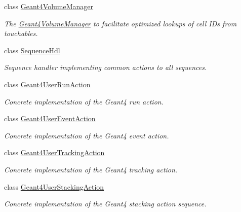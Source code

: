 \begin{DoxyCompactItemize}
class \hyperlink{class_d_d4hep_1_1_simulation_1_1_geant4_volume_manager}{Geant4VolumeManager}
\begin{DoxyCompactList}\small\item\em The \hyperlink{class_d_d4hep_1_1_simulation_1_1_geant4_volume_manager}{Geant4VolumeManager} to facilitate optimized lookups of cell IDs from touchables. \item\end{DoxyCompactList}\item 
class \hyperlink{class_d_d4hep_1_1_simulation_1_1_sequence_hdl}{SequenceHdl}
\begin{DoxyCompactList}\small\item\em Sequence handler implementing common actions to all sequences. \item\end{DoxyCompactList}\item 
class \hyperlink{class_d_d4hep_1_1_simulation_1_1_geant4_user_run_action}{Geant4UserRunAction}
\begin{DoxyCompactList}\small\item\em Concrete implementation of the Geant4 run action. \item\end{DoxyCompactList}\item 
class \hyperlink{class_d_d4hep_1_1_simulation_1_1_geant4_user_event_action}{Geant4UserEventAction}
\begin{DoxyCompactList}\small\item\em Concrete implementation of the Geant4 event action. \item\end{DoxyCompactList}\item 
class \hyperlink{class_d_d4hep_1_1_simulation_1_1_geant4_user_tracking_action}{Geant4UserTrackingAction}
\begin{DoxyCompactList}\small\item\em Concrete implementation of the Geant4 tracking action. \item\end{DoxyCompactList}\item 
class \hyperlink{class_d_d4hep_1_1_simulation_1_1_geant4_user_stacking_action}{Geant4UserStackingAction}
\begin{DoxyCompactList}\small\item\em Concrete implementation of the Geant4 stacking action sequence. \item\end{DoxyCompactList}\item 

\end{DoxyCompactItemize}
